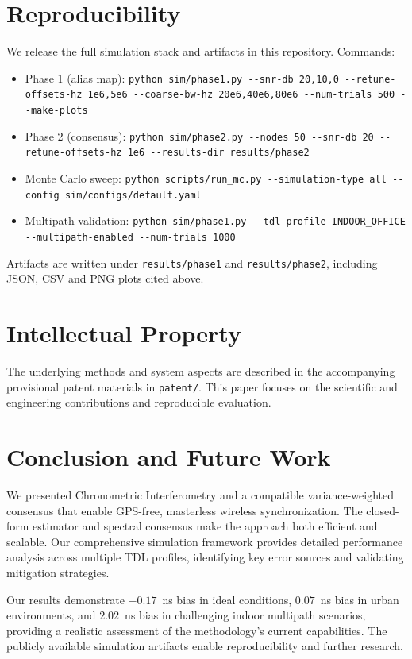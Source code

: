 \documentclass[10pt]{article}
\begin{document}
\section{Reproducibility}
We release the full simulation stack and artifacts in this repository. Commands:
\begin{itemize}[leftmargin=*]
  \item Phase 1 (alias map): \verb|python sim/phase1.py --snr-db 20,10,0 --retune-offsets-hz 1e6,5e6 --coarse-bw-hz 20e6,40e6,80e6 --num-trials 500 --make-plots|
  \item Phase 2 (consensus): \verb|python sim/phase2.py --nodes 50 --snr-db 20 --retune-offsets-hz 1e6 --results-dir results/phase2|
  \item Monte Carlo sweep: \verb|python scripts/run_mc.py --simulation-type all --config sim/configs/default.yaml|
  \item Multipath validation: \verb|python sim/phase1.py --tdl-profile INDOOR_OFFICE --multipath-enabled --num-trials 1000|
\end{itemize}
Artifacts are written under \verb|results/phase1| and \verb|results/phase2|, including JSON, CSV and PNG plots cited above.

\section{Intellectual Property}
The underlying methods and system aspects are described in the accompanying provisional patent materials in \verb|patent/|. This paper focuses on the scientific and engineering contributions and reproducible evaluation.

\section{Conclusion and Future Work}
We presented Chronometric Interferometry and a compatible variance-weighted consensus that enable GPS-free, masterless wireless synchronization. The closed-form estimator and spectral consensus make the approach both efficient and scalable. Our comprehensive simulation framework provides detailed performance analysis across multiple TDL profiles, identifying key error sources and validating mitigation strategies.

Our results demonstrate $-0.17$~ns bias in ideal conditions, $0.07$~ns bias in urban environments, and $2.02$~ns bias in challenging indoor multipath scenarios, providing a realistic assessment of the methodology's current capabilities. The publicly available simulation artifacts enable reproducibility and further research.
\end{document}
